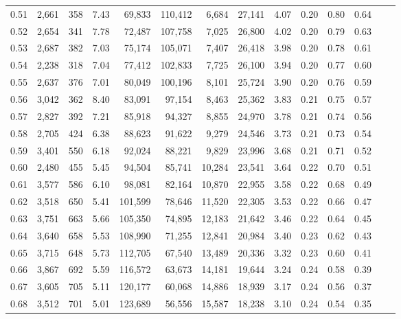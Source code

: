 \begin{tabular}{rrrrrrrrrrrrrr}
0.51 &  2,661 &  358 &    7.43 &   69,833 &  110,412 &   6,684 &  27,141 &  4.07 &  0.20 &  0.80 &      0.64 \\
0.52 &  2,654 &  341 &    7.78 &   72,487 &  107,758 &   7,025 &  26,800 &  4.02 &  0.20 &  0.79 &      0.63 \\
0.53 &  2,687 &  382 &    7.03 &   75,174 &  105,071 &   7,407 &  26,418 &  3.98 &  0.20 &  0.78 &      0.61 \\
0.54 &  2,238 &  318 &    7.04 &   77,412 &  102,833 &   7,725 &  26,100 &  3.94 &  0.20 &  0.77 &      0.60 \\
0.55 &  2,637 &  376 &    7.01 &   80,049 &  100,196 &   8,101 &  25,724 &  3.90 &  0.20 &  0.76 &      0.59 \\
0.56 &  3,042 &  362 &    8.40 &   83,091 &   97,154 &   8,463 &  25,362 &  3.83 &  0.21 &  0.75 &      0.57 \\
0.57 &  2,827 &  392 &    7.21 &   85,918 &   94,327 &   8,855 &  24,970 &  3.78 &  0.21 &  0.74 &      0.56 \\
0.58 &  2,705 &  424 &    6.38 &   88,623 &   91,622 &   9,279 &  24,546 &  3.73 &  0.21 &  0.73 &      0.54 \\
0.59 &  3,401 &  550 &    6.18 &   92,024 &   88,221 &   9,829 &  23,996 &  3.68 &  0.21 &  0.71 &      0.52 \\
0.60 &  2,480 &  455 &    5.45 &   94,504 &   85,741 &  10,284 &  23,541 &  3.64 &  0.22 &  0.70 &      0.51 \\
0.61 &  3,577 &  586 &    6.10 &   98,081 &   82,164 &  10,870 &  22,955 &  3.58 &  0.22 &  0.68 &      0.49 \\
0.62 &  3,518 &  650 &    5.41 &  101,599 &   78,646 &  11,520 &  22,305 &  3.53 &  0.22 &  0.66 &      0.47 \\
0.63 &  3,751 &  663 &    5.66 &  105,350 &   74,895 &  12,183 &  21,642 &  3.46 &  0.22 &  0.64 &      0.45 \\
0.64 &  3,640 &  658 &    5.53 &  108,990 &   71,255 &  12,841 &  20,984 &  3.40 &  0.23 &  0.62 &      0.43 \\
0.65 &  3,715 &  648 &    5.73 &  112,705 &   67,540 &  13,489 &  20,336 &  3.32 &  0.23 &  0.60 &      0.41 \\
0.66 &  3,867 &  692 &    5.59 &  116,572 &   63,673 &  14,181 &  19,644 &  3.24 &  0.24 &  0.58 &      0.39 \\
0.67 &  3,605 &  705 &    5.11 &  120,177 &   60,068 &  14,886 &  18,939 &  3.17 &  0.24 &  0.56 &      0.37 \\
0.68 &  3,512 &  701 &    5.01 &  123,689 &   56,556 &  15,587 &  18,238 &  3.10 &  0.24 &  0.54 &      0.35 \\

\end{tabular}
